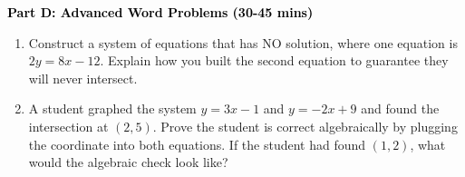 \documentclass[12pt, letterpaper, fleqn]{article}
\begin{document}
\newpage

\begin{tcolorbox}[colback=customteal!20]
\large\textcolor{black}{\textbf{Part D: Advanced Word Problems (30-45 mins)}}
\end{tcolorbox}

\vspace{3mm}

\begin{enumerate}[itemsep=5.5cm, leftmargin=0.6cm, resume]
\item Construct a system of equations that has NO solution, where one equation is $2y = 8x - 12$. Explain how you built the second equation to guarantee they will never intersect.
\item A student graphed the system $y = 3x - 1$ and $y = -2x + 9$ and found the intersection at $(2, 5)$. Prove the student is correct algebraically by plugging the coordinate into both equations. If the student had found $(1, 2)$, what would the algebraic check look like?
\end{enumerate}
\end{document}
